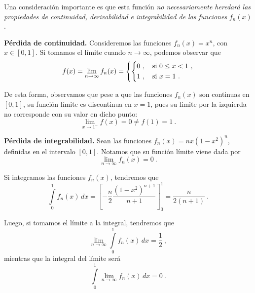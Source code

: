 Una consideración importante es que esta función \emph{no necesariamente heredará las propiedades de continuidad, derivabilidad e integrabilidad de las funciones} $f_n(x)$.

\begin{ejemplo}{\textbf{Pérdida de continuidad.}}
    Consideremos las funciones $f_n(x) = x^n$, con $x \in [0,1]$. Si tomamos el límite cuando $n \to \infty$, podemos observar que
    \begin{equation*}
        f(x) = \lim_{n \to \infty} f_n(x) = \left\{
            \begin{dcases}
                0 \ , \quad \text{si } 0 \leq x < 1 \ , \\
                1 \ , \quad \text{si } x=1 \ .
            \end{dcases}
         \right.
    \end{equation*}

    De esta forma, observamos que pese a que las funciones $f_n(x)$ son continuas en $[0,1]$, su función límite es discontinua en $x=1$, pues su límite por la izquierda no corresponde con su valor en dicho punto:
    \begin{equation*}
        \lim_{x\to 1^-} f(x) = 0 \neq f(1) = 1 \ .
    \end{equation*}
\end{ejemplo}

\begin{ejemplo}{\textbf{Pérdida de integrabilidad.}}
    Sean las funciones $f_n(x) = nx(1-x^2)^n$, definidas en el intervalo $[0,1]$. Notamos que su función límite viene dada por
    \begin{equation*}
        \lim_{n \to \infty} f_n(x) = 0 \ .
    \end{equation*}

    Si integramos las funciones $f_n(x)$, tendremos que 
    \begin{equation*}
        \int\limits_0^1 f_n(x) \, dx = \left[ - \frac{n}{2} \frac{(1-x^2)^{n+1}}{n+1} \right]_0^1 = \frac{n}{2(n+1)} \ .
    \end{equation*}

    Luego, si tomamos el límite a la integral, tendremos que 
    \begin{equation*}
        \lim_{n \to \infty} \int\limits_0^1 f_n(x) \, dx = \frac{1}{2} \ ,
    \end{equation*}
    mientras que la integral del límite será 
    \begin{equation*}
        \int\limits_0^1 \lim_{n \to \infty} f_n(x) \, dx = 0 \ .
    \end{equation*}
\end{ejemplo}

